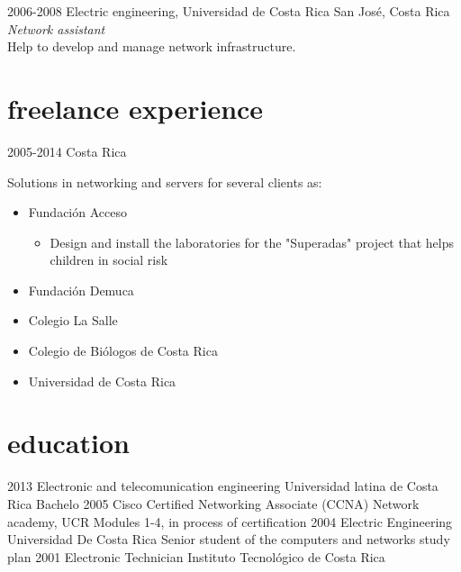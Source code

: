 \documentclass[]{friggeri-cv}
\begin{document}
\begin{entrylist}
\entry
{2006-2008}
{Electric engineering, Universidad de Costa Rica}
{San José, Costa Rica}
{\emph{Network assistant}\\
Help to develop and manage network infrastructure.
}
\end{entrylist}
\section{freelance experience}
\begin{entrylist}
\entry
{2005-2014}
{}
{Costa Rica}
{
Solutions in networking and servers for several clients as:
\begin{itemize}
\item Fundación Acceso
\begin{itemize}
\item Design and install the laboratories for the "Superadas" project that helps children in social risk
\end{itemize}
\item Fundación Demuca
\item Colegio La Salle
\item Colegio de Biólogos de Costa Rica
\item Universidad de Costa Rica
\end{itemize}
}
\end{entrylist}


\section{education}
\begin{entrylist}
	\entry
	{2013}
	{Electronic and telecomunication engineering}
	{Universidad latina de Costa Rica}
	{Bachelo}
	\entry
	{2005}
	{Cisco Certified Networking Associate (CCNA)}
	{Network academy, UCR}
	{Modules 1-4, in process of certification}
	\entry
	{2004}
	{Electric Engineering}
	{Universidad De Costa Rica}
	{Senior student of the computers and networks study plan}
	\entry
	{2001}
	{Electronic Technician}
	{Instituto Tecnológico de Costa Rica}
	{}
\end{entrylist}
\end{document}
